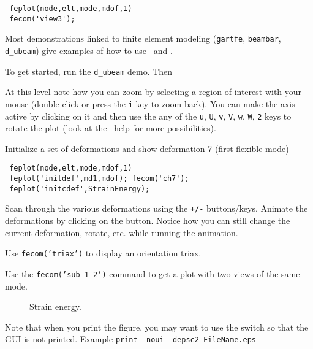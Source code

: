 \begin{verbatim}
 feplot(node,elt,mode,mdof,1)
 fecom('view3');
\end{verbatim}

\begin{SDT}
Most demonstrations linked to finite element modeling ({\tt gartfe}, {\tt beambar}, {\tt d\_ubeam}) give examples of how to use \feplot\ and \fecom.
\end{SDT}

To get started, run the {\tt d\_ubeam} demo. Then 

\begin{Eitem}

\item At this level note how you can zoom by selecting a region of interest with your mouse (double click or press the {\tt i} key to zoom back). You can make the axis active by clicking on it and then use the any of the {\tt u}, {\tt U}, {\tt v}, {\tt V}, {\tt w}, {\tt W}, {\tt 2} keys to rotate the plot (look at the \iimouse\ help for more possibilities).

\item Initialize a set of deformations and show deformation 7 (first flexible mode)
\begin{verbatim}
 feplot(node,elt,mode,mdof,1)
 feplot('initdef',md1,mdof); fecom('ch7');
 feplot('initcdef',StrainEnergy);
\end{verbatim}


\item Scan through the various deformations using the {\tt +/-} buttons/keys. Animate the deformations by clicking on the  button. Notice how you can still change the current deformation, rotate, etc. while running the animation.

\item Use {\tt fecom('triax')} to display an orientation triax. 

\item Use the {\tt fecom('sub 1 2')} command  to get a plot with two views of the same mode. 

\begin{figure}[H]
\centering
{} %
 \caption{Strain energy.}
  \label{fig:tt_strain}
\end{figure}

\item Note that when you print the figure, you may want to use the  switch so that the GUI is not printed. Example {\tt print -noui -depsc2 FileName.eps}
\end{Eitem}


